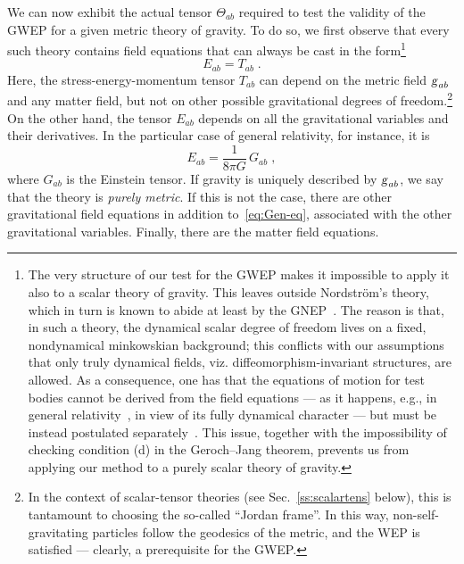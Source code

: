 \documentclass[a4paper,showkeys,aps,prd,reprint,nofootinbib,showpacs,twocolumn]{revtex4-1}
\newcommand{\eq}[1]{\( #1 \)}
\newcommand{\eqd}[1]{\begin{equation} #1 \end{equation}}
\newcommand{\matg}{\text{\textsl{g}}}%
\theoremstyle{plain}
\begin{document}
We can now exhibit the actual tensor \eq{\Theta_{ab}} required to test the validity of the GWEP for a given metric theory of gravity. To do so, we first observe that every such theory contains field equations that can always be cast in the form\footnote{The very structure of our test for the GWEP makes it impossible to apply it also to a scalar theory of gravity. This leaves outside Nordstr{\"o}m's theory, which in turn is known to abide at least by the GNEP~\cite{deruelle}. The reason is that, in such a theory, the dynamical scalar degree of freedom lives on a fixed, nondynamical minkowskian background; this conflicts with our assumptions that only truly dynamical fields, viz. diffeomorphism-invariant structures, are allowed. As a consequence, one has that the equations of motion for test bodies cannot be derived from the field equations --- as it happens, e.g., in general relativity~\cite{infeldschild}, in view of its fully dynamical character --- but must be instead postulated separately~\cite{Ravndal:2004ym}. This issue, together with the impossibility of checking condition (d) in the Geroch--Jang theorem, prevents us from applying our method to a purely scalar theory of gravity.}
%
\eqd{E_{ab} = T_{ab} \;. \label{eq:Gen-eq} }
%
Here, the stress-energy-momentum tensor \eq{T_{ab}} can depend on the metric field \eq{\matg_{ab}} and any matter field, but not on other possible gravitational degrees of freedom.\footnote{In the context of scalar-tensor theories (see Sec.~\ref{ss:scalartens} below), this is tantamount to choosing the so-called ``Jordan frame''.  In this way, non-self-gravitating particles follow the geodesics of the metric, and the WEP is satisfied --- clearly, a prerequisite for the GWEP.}  On the other hand, the tensor \eq{E_{ab}} depends on all the gravitational variables and their derivatives.  In the particular case of general relativity, for instance, it is 
%
\eqd{E_{ab} = \frac{1}{8 \pi G} \, G_{ab} \;, \label{EGR}}
%
where \eq{G_{ab}} is the Einstein tensor.  If gravity is uniquely described by \eq{\matg_{ab}}, we say that the theory is \emph{purely metric}.  If this is not the case, there are other gravitational field equations in addition to~\eqref{eq:Gen-eq}, associated with the other gravitational variables.  Finally, there are the matter field equations.
\end{document}
